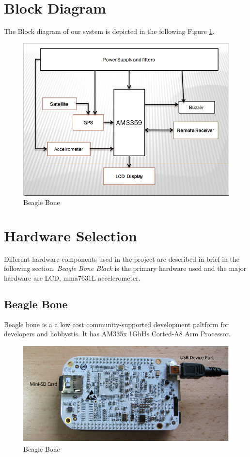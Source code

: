 \documentclass[11pt,a4paper]{article}
\begin{document}
\section{Block Diagram}
The Block diagram of our system is depicted in the following Figure \ref{fig:BlockDiagram}.
\begin{figure}[h]	
	\centering
	\includegraphics[scale=.35]{BaleImages/BlockDiagram.png}
	\caption{Beagle Bone}
	\label{fig:BlockDiagram}
\end{figure}


\section{Hardware Selection}
Different hardware components used in the project are described in brief in the following section. \textit{Beagle Bone Black} is the primary hardware used and the major hardware are LCD, mma7631L accelerometer.
\subsection{Beagle Bone}
Beagle bone is a a low cost community-supported development paltform for developers and hobbystis. It has AM335x 1GhHs Corted-A8 Arm Processor.
\begin{figure}[h]	
	\centering
	\includegraphics[scale=.35]{BaleImages/beagleBone.png}
	\caption{Beagle Bone}
	\label{fig:BeagleBone}
\end{figure}
\end{document}
